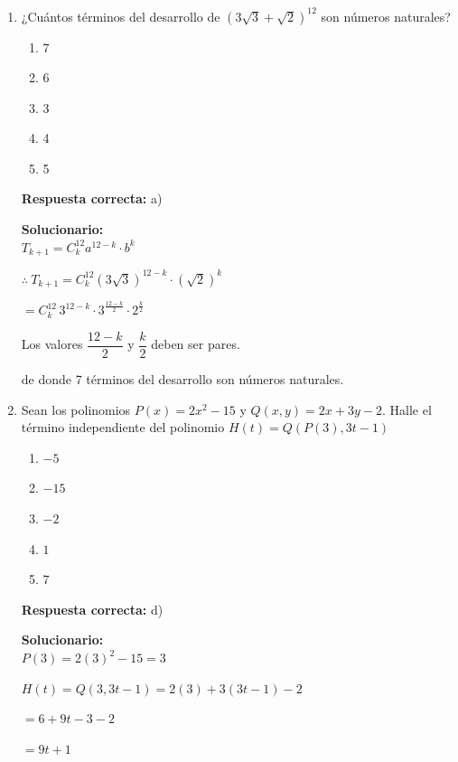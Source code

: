 \begin{enumerate}
	
	\item ¿Cuántos términos del desarrollo de $(3\sqrt{3}+\sqrt{2})^{12}$ son números naturales?
	\begin{enumerate}[label=\alph*)]
		\item 7
		\item 6
		\item 3
		\item 4
		\item 5
	\end{enumerate}
	\textbf{Respuesta correcta:} a)
	
	\vspace{2mm}
	\textbf{Solucionario:}\\
	
	$T_{k+1}=C_k^{12}a^{12-k}\cdot b^k$
	
	$\therefore\ T_{k+1}=C_k^{12}(3\sqrt{3})^{12-k}\cdot (\sqrt{2})^k$
	
	$=C_k^{12}\,3^{12-k}\cdot 3^{\frac{12-k}{2}}\cdot 2^{\frac{k}{2}}$
	
	Los valores $\dfrac{12-k}{2}$ y $\dfrac{k}{2}$ deben ser pares.
	
	
	de donde 7 términos del desarrollo son números naturales.
	
	\vspace{6mm}
	
	\item Sean los polinomios $P(x)=2x^2-15$ y $Q(x,y)=2x+3y-2$. Halle el término independiente del polinomio $H(t)=Q(P(3),3t-1)$
	\begin{enumerate}[label=\alph*)]
		\item $-5$
		\item $-15$
		\item $-2$
		\item $1$
		\item $7$
	\end{enumerate}
	\textbf{Respuesta correcta:} d)
	
	\vspace{2mm}
	\textbf{Solucionario:}\\
	
	$P(3)=2(3)^2-15=3$
	
	$H(t)=Q(3,3t-1)=2(3)+3(3t-1)-2$
	
	$=6+9t-3-2$
	
	$=9t+1$
	
	

\end{enumerate}
